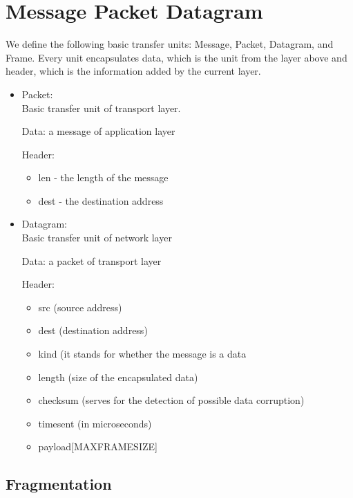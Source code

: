 \documentclass{article}
\begin{document}
\section{Message Packet Datagram}



We define the following basic transfer units: Message, Packet, Datagram, and
Frame. Every unit encapsulates data, which is the unit from the layer above and
header, which is the information added by the current layer. 

\begin{itemize}
  
  \item Packet: \\
  Basic transfer unit of transport layer. 
  
    Data:  a message of application layer
  
    Header:  
  \begin{itemize}
    \item len - the length of the message
    \item dest - the destination address
    \end{itemize}
  
  \item Datagram: \\
   Basic transfer unit of network layer
   
     Data: a packet of transport layer
   
     Header: 
   \begin{itemize}
     \item src (source address)
     \item dest (destination address)
     \item kind (it stands for whether the message is a data 
     \item length (size of the encapsulated data)
     \item checksum (serves for the detection of possible data corruption)
     \item timesent (in microseconds)
     \item payload[MAXFRAMESIZE]
\end{itemize}

 \end{itemize}

\subsection{Fragmentation}
\end{document}
